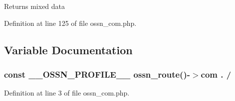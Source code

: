 \begin{DoxyReturn}{Returns}
mixed data 
\end{DoxyReturn}


Definition at line 125 of file ossn\+\_\+com.\+php.



\subsection{Variable Documentation}
\subsubsection[{\texorpdfstring{\+\_\+\+\_\+\+O\+S\+S\+N\+\_\+\+P\+R\+O\+F\+I\+L\+E\+\_\+\+\_\+}{__OSSN_PROFILE__}}]{\setlength{\rightskip}{0pt plus 5cm}const \+\_\+\+\_\+\+O\+S\+S\+N\+\_\+\+P\+R\+O\+F\+I\+L\+E\+\_\+\+\_\+ {\bf ossn\+\_\+route}()-\/$>$com . /\textquotesingle{}}\hypertarget{_ossn_profile_2ossn__com_8php_a142ff08483625e4058cfda3fba557a9a}{}\label{_ossn_profile_2ossn__com_8php_a142ff08483625e4058cfda3fba557a9a}


Definition at line 3 of file ossn\+\_\+com.\+php.

